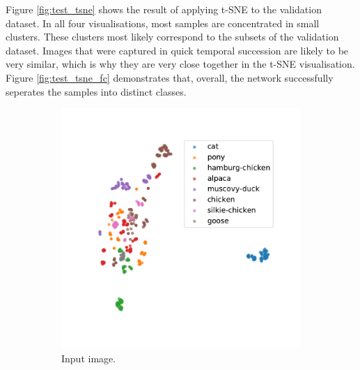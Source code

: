 \documentclass{l4proj}
\begin{document}
Figure \ref{fig:test_tsne} shows the result of applying t-SNE to the validation dataset. In all four visualisations, most samples are concentrated in small clusters. These clusters most likely correspond to the subsets of the validation dataset. Images that were captured in quick temporal succession are likely to be very similar, which is why they are very close together in the t-SNE visualisation. Figure \ref{fig:test_tsne_fc} demonstrates that, overall, the network successfully seperates the samples into distinct classes.

\begin{figure}[ht]
  \centering
  \begin{subfigure}[h!]{0.4\textwidth}
    \includegraphics[width=\textwidth, trim={1cm 1cm 1cm 1cm}, clip]{images/evaluation/embedding/val/input}
    \caption{Input image.}
    \label{fig:test_tsne_input}
  \end{subfigure}
  \quad
  \begin{subfigure}[h!]{0.4\textwidth}

\end{subfigure}
\end{figure}
\end{document}
